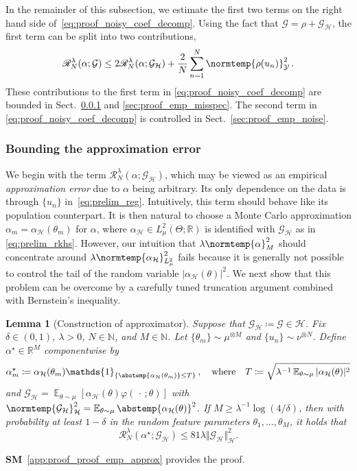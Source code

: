 \documentclass{article}
\theoremstyle{plain}
\newtheorem{lemma}[theorem]{Lemma}
\theoremstyle{my_def}
\theoremstyle{my_rem}
\numberwithin{equation}{section}
\numberwithin{theorem}{section}%
\newcommand{\R}{\mathbb{R}}
\newcommand{\E}{\mathbb{E}}
\newcommand{\N}{\mathbb{N}}
\newcommand{\scrR}{\mathscr{R}}
\newcommand{\cG}{\mathcal{G}}
\newcommand{\cH}{\mathcal{H}}
\newcommand{\cY}{\mathcal{Y}}
\newcommand{\one}{\mathds{1}}%
\newcommand{\norm}{\normtemp}
\newcommand{\abs}{\abstemp}
\newcommand{\slot}{{\,\cdot\,}}
\newcommand{\defeq}{\coloneqq} %
\renewcommand{\E}{\operatorname{\mathbb{E}}} %
\newcommand{\al}{\alpha}
\def\qw{\quad\text{where}\quad}
\newcommand{\U}{{\{u_n\}}}
\newcommand{\Th}{{\{\theta_m\}}}
\newcommand{\GH}{\cG_{\cH}}
\renewcommand{\phi}{\varphi}
\newcommand{\alst}{\al^{\star}}
\begin{document}
In the remainder of this subsection, we estimate the first two terms on the right hand side of~\eqref{eq:proof_noisy_coef_decomp}. Using the fact that $\cG=\rho+\GH$, the first term can be split into two contributions,
\begin{equation}\label{eq:proof_emp_2split}
    \scrR_N^\lambda(\alpha;\cG)\leq 2\scrR_N^\lambda(\alpha;\GH) + \frac{2}{N}\sum_{n=1}^N\norm{\rho(u_n)}_\cY^2\,.
\end{equation}
These contributions to the first term in \eqref{eq:proof_noisy_coef_decomp} are bounded in Sect.~\ref{sec:proof_emp_approx} and \ref{sec:proof_emp_misspec}. The second term in \eqref{eq:proof_noisy_coef_decomp} is controlled in Sect.~\ref{sec:proof_emp_noise}.


\subsubsection{Bounding the approximation error}\label{sec:proof_emp_approx}
We begin with the term $\scrR_N^\lambda(\al;\GH)$, which may be viewed as an empirical \emph{approximation error} due to $\al$ being arbitrary. Its only dependence on the data is through $\U$ in~\eqref{eq:prelim_reg}. Intuitively, this term should behave like its population counterpart. It is then natural to choose a Monte Carlo approximation $\al_m=\al_\cH(\theta_m)$ for $\al$, where $\al_\cH\in L^2_\mu(\Theta;\R)$ is identified with $\GH$ as in \eqref{eq:prelim_rkhs}. However, our intuition that $\lambda\norm{\al}_M^2$ should concentrate around $\lambda\norm{\al_\cH}_{L^2_\mu}^2$ fails because it is generally not possible to control the tail of the random variable $|\al_\cH(\theta)|^2$. We next show that this problem can be overcome by a carefully tuned truncation argument combined with Bernstein's inequality. 

\begin{lemma}[Construction of approximator]\label{lem:alphabd_exist}
Suppose that $\GH\defeq \cG\in \cH$. Fix $\delta\in(0,1)$, $\lambda>0$, $N\in\N$, and $M\in\N$. Let $\Th\sim\mu^{\otimes M}$ and $\U\sim\nu^{\otimes N}$. Define $\alst \in \R^M$ componentwise by
\begin{equation}\label{eq:alstar_exist}
    \alst_m\defeq \al_\cH(\theta_m)\one_{\{\abs{\al_\cH(\theta_m)}\leq T\}}\,,\qw T \defeq \sqrt{\lambda^{-1}\E_{\theta\sim\mu}|\al_\cH(\theta)|^2}
\end{equation}
and
$\GH=\E_{\theta\sim\mu}[\al_\cH(\theta)\phi(\slot;\theta)]$ with $\norm{\GH}_\cH^2=\E_{\theta\sim\mu}\abs{\al_\cH(\theta)}^2$.
If $M \ge \lambda^{-1}\log(4/\delta)$, then with probability at least $ 1-\delta$ in the random feature parameters $\theta_1,\dots, \theta_M$, it holds that
\begin{equation}\label{eq:alphabd_exist}
    \scrR_N^\lambda(\alst;\GH) \le 81 \lambda \Vert \GH \Vert_{\cH}^2.
\end{equation}
\end{lemma}
{\bf SM}~\ref{app:proof_proof_emp_approx} provides the proof.
\end{document}
